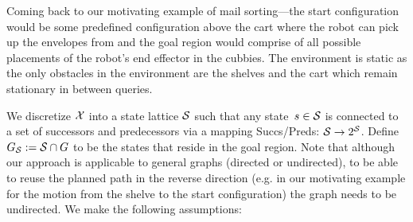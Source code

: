 \documentclass[a4paper,10pt]{article}
\begin{document}
Coming back to our motivating example of mail sorting---the start configuration would be some predefined configuration above the cart where the robot can pick up the envelopes from and the goal region would comprise of all possible placements of the robot's end effector in the cubbies. The environment is static as the only obstacles in the environment are the shelves and the cart which remain stationary in between queries.

We discretize $\mathcal{X}$ into a state lattice $\mathcal{S}$ such that any state~$s \in \mathcal{S}$ is connected to a set of successors and predecessors via a mapping Succs/Preds: $\mathcal{S} \rightarrow 2^\mathcal{S}$.
Define $G_\mathcal{S} := \mathcal{S} \cap G$ to be the states that reside in the goal region. Note that although our approach is applicable to general graphs (directed or undirected), to be able to reuse the planned path in the reverse direction (e.g. in our motivating example for the motion from the shelve to the start configuration) the graph needs to be undirected.
We make the following assumptions:
\end{document}

